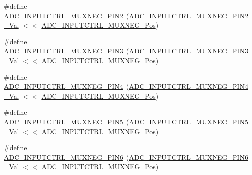 \begin{DoxyCompactItemize}
\item 
\#define \mbox{\hyperlink{group___s_a_m_d21___a_d_c_ga4a9349931d25b42692584ace3d92703f}{A\+D\+C\+\_\+\+I\+N\+P\+U\+T\+C\+T\+R\+L\+\_\+\+M\+U\+X\+N\+E\+G\+\_\+\+P\+I\+N2}}~(\mbox{\hyperlink{group___s_a_m_d21___a_d_c_ga5cac027516aad10977ceeea22e55a4df}{A\+D\+C\+\_\+\+I\+N\+P\+U\+T\+C\+T\+R\+L\+\_\+\+M\+U\+X\+N\+E\+G\+\_\+\+P\+I\+N2\+\_\+\+Val}} $<$$<$ \mbox{\hyperlink{group___s_a_m_d21___a_d_c_ga47f933ef105812dd56ccffab8f7a0877}{A\+D\+C\+\_\+\+I\+N\+P\+U\+T\+C\+T\+R\+L\+\_\+\+M\+U\+X\+N\+E\+G\+\_\+\+Pos}})
\item 
\#define \mbox{\hyperlink{group___s_a_m_d21___a_d_c_ga952cc3d06788ab7218b9a2c38ebf0297}{A\+D\+C\+\_\+\+I\+N\+P\+U\+T\+C\+T\+R\+L\+\_\+\+M\+U\+X\+N\+E\+G\+\_\+\+P\+I\+N3}}~(\mbox{\hyperlink{group___s_a_m_d21___a_d_c_gaa68f0ba48faf723b5685b98c58d0d0b4}{A\+D\+C\+\_\+\+I\+N\+P\+U\+T\+C\+T\+R\+L\+\_\+\+M\+U\+X\+N\+E\+G\+\_\+\+P\+I\+N3\+\_\+\+Val}} $<$$<$ \mbox{\hyperlink{group___s_a_m_d21___a_d_c_ga47f933ef105812dd56ccffab8f7a0877}{A\+D\+C\+\_\+\+I\+N\+P\+U\+T\+C\+T\+R\+L\+\_\+\+M\+U\+X\+N\+E\+G\+\_\+\+Pos}})
\item 
\#define \mbox{\hyperlink{group___s_a_m_d21___a_d_c_gaa7da91744415944b9ee515d7e8fc7420}{A\+D\+C\+\_\+\+I\+N\+P\+U\+T\+C\+T\+R\+L\+\_\+\+M\+U\+X\+N\+E\+G\+\_\+\+P\+I\+N4}}~(\mbox{\hyperlink{group___s_a_m_d21___a_d_c_gaf239f857af0338bbe836ed43b4c454a8}{A\+D\+C\+\_\+\+I\+N\+P\+U\+T\+C\+T\+R\+L\+\_\+\+M\+U\+X\+N\+E\+G\+\_\+\+P\+I\+N4\+\_\+\+Val}} $<$$<$ \mbox{\hyperlink{group___s_a_m_d21___a_d_c_ga47f933ef105812dd56ccffab8f7a0877}{A\+D\+C\+\_\+\+I\+N\+P\+U\+T\+C\+T\+R\+L\+\_\+\+M\+U\+X\+N\+E\+G\+\_\+\+Pos}})
\item 
\#define \mbox{\hyperlink{group___s_a_m_d21___a_d_c_gafd7576b7df9e5eaa43534600a600e02e}{A\+D\+C\+\_\+\+I\+N\+P\+U\+T\+C\+T\+R\+L\+\_\+\+M\+U\+X\+N\+E\+G\+\_\+\+P\+I\+N5}}~(\mbox{\hyperlink{group___s_a_m_d21___a_d_c_gaf54613ab0805d9fadc9a4db0f1e14c98}{A\+D\+C\+\_\+\+I\+N\+P\+U\+T\+C\+T\+R\+L\+\_\+\+M\+U\+X\+N\+E\+G\+\_\+\+P\+I\+N5\+\_\+\+Val}} $<$$<$ \mbox{\hyperlink{group___s_a_m_d21___a_d_c_ga47f933ef105812dd56ccffab8f7a0877}{A\+D\+C\+\_\+\+I\+N\+P\+U\+T\+C\+T\+R\+L\+\_\+\+M\+U\+X\+N\+E\+G\+\_\+\+Pos}})
\item 
\#define \mbox{\hyperlink{group___s_a_m_d21___a_d_c_ga05cd7028162ff0073c8990a197c2b9ce}{A\+D\+C\+\_\+\+I\+N\+P\+U\+T\+C\+T\+R\+L\+\_\+\+M\+U\+X\+N\+E\+G\+\_\+\+P\+I\+N6}}~(\mbox{\hyperlink{group___s_a_m_d21___a_d_c_ga91db26a404da4d2983a37408f80841c9}{A\+D\+C\+\_\+\+I\+N\+P\+U\+T\+C\+T\+R\+L\+\_\+\+M\+U\+X\+N\+E\+G\+\_\+\+P\+I\+N6\+\_\+\+Val}} $<$$<$ \mbox{\hyperlink{group___s_a_m_d21___a_d_c_ga47f933ef105812dd56ccffab8f7a0877}{A\+D\+C\+\_\+\+I\+N\+P\+U\+T\+C\+T\+R\+L\+\_\+\+M\+U\+X\+N\+E\+G\+\_\+\+Pos}})
$$
\end{DoxyCompactItemize}
